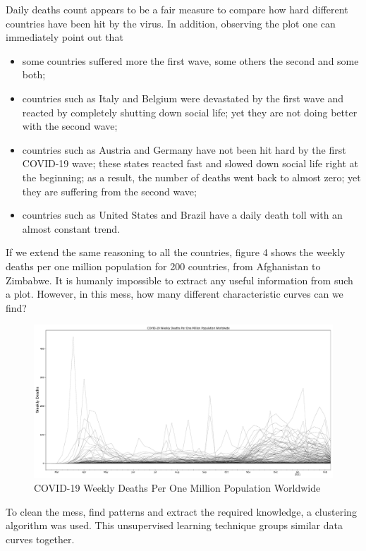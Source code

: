 \documentclass[11pt,a4paper]{article}
\begin{document}
\noindent
Daily deaths count appears to be a fair measure to compare how hard different
countries have been hit by the virus. In addition, observing the plot one can
immediately point out that
\begin{itemize}
    \item some countries suffered more the first wave, some others the second
    and some both;
    \item countries such as {\color{ts_italy}Italy} and
    {\color{ts_belgium}Belgium} were devastated by the first wave and reacted
    by completely shutting down social life; yet they are not doing better with
    the second wave;
    \item countries such as {\color{ts_austria}Austria} and
    {\color{ts_germany}Germany} have not been hit hard by the first COVID-19
    wave; these states reacted fast and slowed down social life right at the
    beginning; as a result, the number of deaths went back to almost zero; yet
    they are suffering from the second wave;
    \item countries such as {\color{ts_unitedstates}United States} and
    {\color{cyan}Brazil} have a daily death toll with an almost constant
    trend.
\end{itemize}
If we extend the same reasoning to all the countries, figure 4 shows the weekly
deaths per one million population for 200 countries, from Afghanistan to
Zimbabwe. It is humanly impossible to extract any useful information from such a
plot. However, in this mess, how many different characteristic curves can we
find?
\begin{figure}[H]
    \begin{center}
        \hspace*{-0.3cm}
        \includegraphics[scale=0.32]{img/weekly-deaths-worldwide.pdf}
    \end{center}
    \vspace{-0.2cm}
    \caption{COVID-19 Weekly Deaths Per One Million Population Worldwide}
\end{figure}
\noindent
To clean the mess, find patterns and extract the required knowledge, a
clustering algorithm was used. This unsupervised learning technique groups
similar data curves together.
\end{document}
